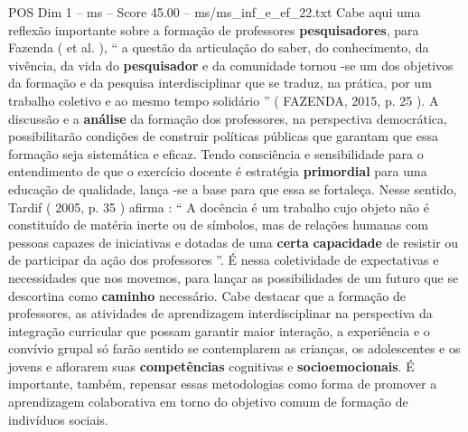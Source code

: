\begin{textsample}{POS Dim 1 – ms – Score 45.00 – ms/ms\_inf\_e\_ef\_22.txt}
Cabe aqui uma reflexão importante sobre a formação de professores \textbf{pesquisadores}, para Fazenda ( et al. ), “ a questão da articulação do saber, do conhecimento, da vivência, da vida do \textbf{pesquisador} e da comunidade tornou -se um dos objetivos da formação e da pesquisa interdisciplinar que se traduz, na prática, por um trabalho coletivo e ao mesmo tempo solidário ” ( FAZENDA, 2015, p. 25 ).
A discussão e a \textbf{análise} da formação dos professores, na perspectiva democrática, possibilitarão condições de construir políticas públicas que garantam que essa formação seja sistemática e eficaz.
Tendo consciência e sensibilidade para o entendimento de que o exercício docente é estratégia \textbf{primordial} para uma educação de qualidade, lança -se a base para que essa se fortaleça.
Nesse sentido, Tardif ( 2005, p. 35 ) afirma : “ A docência é um trabalho cujo objeto não é constituído de matéria inerte ou de símbolos, mas de relações humanas com pessoas capazes de iniciativas e dotadas de uma \textbf{certa} \textbf{capacidade} de resistir ou de participar da ação dos professores ”.
É nessa coletividade de expectativas e necessidades que nos movemos, para lançar as possibilidades de um futuro que se descortina como \textbf{caminho} necessário.
Cabe destacar que a formação de professores, as atividades de aprendizagem interdisciplinar na perspectiva da integração curricular que possam garantir maior interação, a experiência e o convívio grupal só farão sentido se contemplarem as crianças, os adolescentes e os jovens e aflorarem suas \textbf{competências} cognitivas e \textbf{socioemocionais}.
É importante, também, repensar essas metodologias como forma de promover a aprendizagem colaborativa em torno do objetivo comum de formação de indivíduos sociais.

\end{textsample}
